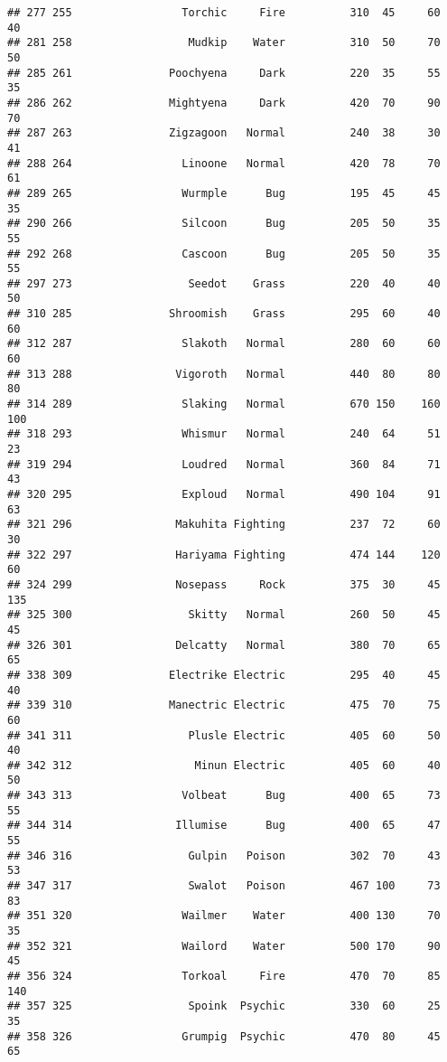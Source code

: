 \documentclass[
]{article}
\begin{document}
\begin{verbatim}
## 277 255                 Torchic     Fire          310  45     60      40
## 281 258                  Mudkip    Water          310  50     70      50
## 285 261               Poochyena     Dark          220  35     55      35
## 286 262               Mightyena     Dark          420  70     90      70
## 287 263               Zigzagoon   Normal          240  38     30      41
## 288 264                 Linoone   Normal          420  78     70      61
## 289 265                 Wurmple      Bug          195  45     45      35
## 290 266                 Silcoon      Bug          205  50     35      55
## 292 268                 Cascoon      Bug          205  50     35      55
## 297 273                  Seedot    Grass          220  40     40      50
## 310 285               Shroomish    Grass          295  60     40      60
## 312 287                 Slakoth   Normal          280  60     60      60
## 313 288                Vigoroth   Normal          440  80     80      80
## 314 289                 Slaking   Normal          670 150    160     100
## 318 293                 Whismur   Normal          240  64     51      23
## 319 294                 Loudred   Normal          360  84     71      43
## 320 295                 Exploud   Normal          490 104     91      63
## 321 296                Makuhita Fighting          237  72     60      30
## 322 297                Hariyama Fighting          474 144    120      60
## 324 299                Nosepass     Rock          375  30     45     135
## 325 300                  Skitty   Normal          260  50     45      45
## 326 301                Delcatty   Normal          380  70     65      65
## 338 309               Electrike Electric          295  40     45      40
## 339 310               Manectric Electric          475  70     75      60
## 341 311                  Plusle Electric          405  60     50      40
## 342 312                   Minun Electric          405  60     40      50
## 343 313                 Volbeat      Bug          400  65     73      55
## 344 314                Illumise      Bug          400  65     47      55
## 346 316                  Gulpin   Poison          302  70     43      53
## 347 317                  Swalot   Poison          467 100     73      83
## 351 320                 Wailmer    Water          400 130     70      35
## 352 321                 Wailord    Water          500 170     90      45
## 356 324                 Torkoal     Fire          470  70     85     140
## 357 325                  Spoink  Psychic          330  60     25      35
## 358 326                 Grumpig  Psychic          470  80     45      65

\end{verbatim}
\end{document}
